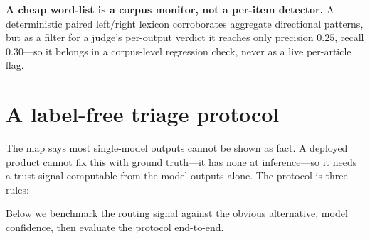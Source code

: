 \documentclass{article}
\begin{document}
\textbf{A cheap word-list is a corpus monitor, not a per-item detector.}
A deterministic paired left/right lexicon corroborates aggregate
directional patterns, but as a filter for a judge's per-output verdict
it reaches only precision $0.25$, recall $0.30$---so it belongs in a
corpus-level regression check, never as a live per-article flag.

\section{A label-free triage protocol}
\label{sec:triage}
The map says most single-model outputs cannot be shown as fact. A
deployed product cannot fix this with ground truth---it has none at
inference---so it needs a trust signal computable from the model outputs
alone. The protocol is three rules:

\vspace{2pt}\noindent{}\vspace{2pt}

Below we benchmark the routing signal against the obvious alternative,
model confidence, then evaluate the protocol end-to-end.
\end{document}
